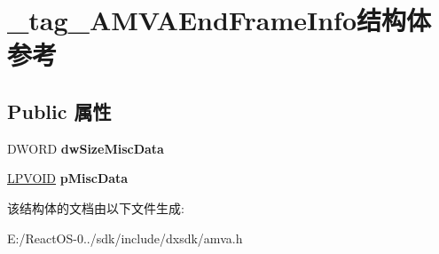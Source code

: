 \hypertarget{struct__tag___a_m_v_a_end_frame_info}{}\section{\+\_\+tag\+\_\+\+A\+M\+V\+A\+End\+Frame\+Info结构体 参考}
\label{struct__tag___a_m_v_a_end_frame_info}
\subsection*{Public 属性}
\begin{DoxyCompactItemize}
\item 
\mbox{\label{struct__tag___a_m_v_a_end_frame_info_ae0759240d6113ecb68b4c7e96c852d9b}} 
D\+W\+O\+RD {\bfseries dw\+Size\+Misc\+Data}
\item 
\mbox{\label{struct__tag___a_m_v_a_end_frame_info_a859138149009dc97f23c2cdd75e21ca0}} 
\hyperlink{interfacevoid}{L\+P\+V\+O\+ID} {\bfseries p\+Misc\+Data}
\end{DoxyCompactItemize}


该结构体的文档由以下文件生成\+:\begin{DoxyCompactItemize}
\item 
E\+:/\+React\+O\+S-\/0../sdk/include/dxsdk/amva.\+h\end{DoxyCompactItemize}
